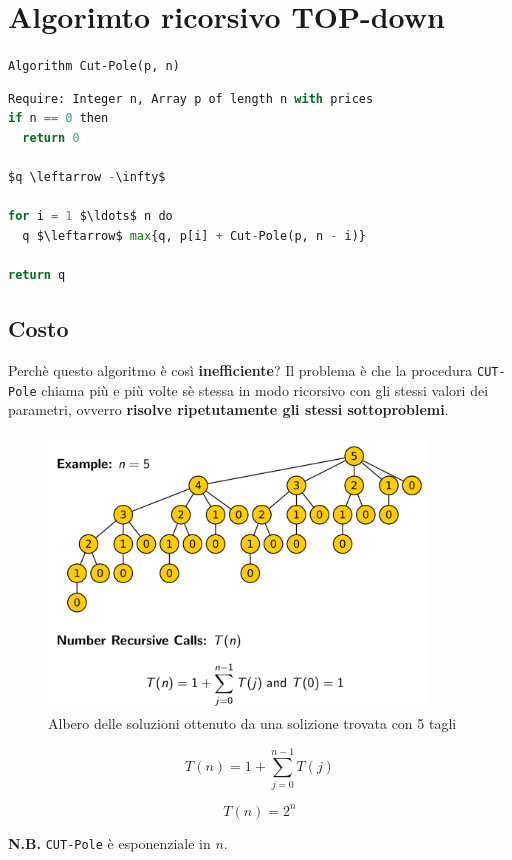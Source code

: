 \section{Algorimto ricorsivo TOP-down}

\texttt{Algorithm\ Cut-Pole(p,\ n)}

\begin{lstlisting}[language=Python, mathescape=true]
Require: Integer n, Array p of length n with prices
if n == 0 then
  return 0

$q \leftarrow -\infty$

for i = 1 $\ldots$ n do
  q $\leftarrow$ max{q, p[i] + Cut-Pole(p, n - i)}

return q
\end{lstlisting}

\subsection{Costo}

Perchè questo algoritmo è così \textbf{inefficiente}? Il problema è che
la procedura \texttt{CUT-Pole} chiama più e più volte sè stessa in modo
ricorsivo con gli stessi valori dei parametri, ovverro \textbf{risolve
  ripetutamente gli stessi sottoproblemi}.
\begin{figure}[H]
  \centering
  \includegraphics[width=10cm, keepaspectratio]{capitoli/programmazione_dinamica/imgs/pole4.png}
  \caption{Albero delle soluzioni ottenuto da una solizione trovata con 5 tagli}

\end{figure}

$$
  T(n) = 1 + \sum^{n-1}_{j=0}T(j)
$$

$$
  T(n) = 2^n
$$

\textbf{N.B.} \texttt{CUT-Pole} è esponenziale in $n$.\\

